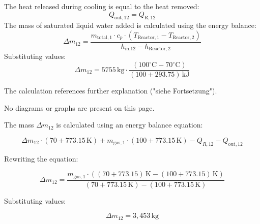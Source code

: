 The heat released during cooling is equal to the heat removed:  
\[
Q_{\text{out},12} = Q_{\text{R},12}
\]  
The mass of saturated liquid water added is calculated using the energy balance:  
\[
\Delta m_{12} = \frac{m_{\text{total},1} \cdot c_p \cdot (T_{\text{Reactor},1} - T_{\text{Reactor},2})}{h_{\text{in,12}} - h_{\text{Reactor},2}}
\]  
Substituting values:  
\[
\Delta m_{12} = 5755 \, \text{kg} \cdot \frac{(100^\circ\text{C} - 70^\circ\text{C})}{(100 + 293.75) \, \text{kJ}}
\]  

The calculation references further explanation ("siehe Fortsetzung").  

No diagrams or graphs are present on this page.

The mass \( \Delta m_{12} \) is calculated using an energy balance equation:  

\[
\Delta m_{12} \cdot \left( 70 + 773.15 \, \text{K} \right) + m_{\text{gas},1} \cdot \left( 100 + 773.15 \, \text{K} \right) - Q_{R,12} - Q_{\text{out},12}
\]

Rewriting the equation:  

\[
\Delta m_{12} = \frac{m_{\text{gas},1} \cdot \left( (70 + 773.15) \, \text{K} - (100 + 773.15) \, \text{K} \right)}{\left( 70 + 773.15 \, \text{K} \right) - \left( 100 + 773.15 \, \text{K} \right)}
\]

Substituting values:  

\[
\Delta m_{12} = 3,453 \, \text{kg}
\]